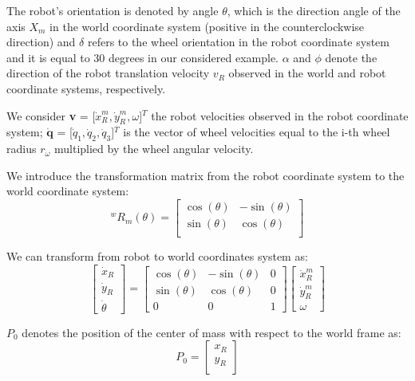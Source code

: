 The robot's orientation is denoted by angle $\theta$, which is the direction angle of the axis $X_m$ in the world coordinate system (positive in the counterclockwise direction) and $\delta$ refers to the wheel orientation in the robot coordinate system and it is equal to 30 degrees in our considered example. $\alpha$ and $\phi$ denote the direction of the robot translation velocity $v_R$ observed in the world and robot coordinate systems, respectively.

We consider \textbf{v} = [$\dot{x}^m_R,\dot{y}^m_R,\omega$]$^T$ the robot velocities observed in the robot coordinate system; $\mathbf{\dot{q}}$ = [$\dot{q}_1,\dot{q}_2,\dot{q}_3$]$^T$ is the vector of wheel velocities equal to the i-th wheel radius $r_\omega$ multiplied by the wheel angular velocity.

We introduce the transformation matrix from the robot coordinate system to the world coordinate system:
\begin{equation}
^wR_m(\theta)=\begin{bmatrix}
\cos(\theta) &-\sin(\theta)\\
\sin(\theta) & \cos(\theta)\\
\end{bmatrix}
\end{equation}

We can transform from robot to world coordinates system as:
\begin{equation}
\begin{bmatrix}
\dot{x}_R\\
\dot{y}_R\\
\dot{\theta}
\end{bmatrix} =
\begin{bmatrix}
\cos(\theta) &-\sin(\theta) & 0\\
\sin(\theta) & \cos(\theta) & 0\\
0 & 0 & 1
\end{bmatrix}
\begin{bmatrix}
\dot{x}^m_R\\
\dot{y}^m_R\\
\omega
\end{bmatrix}
\label{eq:rotation}
\end{equation}

$P_0$ denotes the position of the center of mass with respect to the world frame as:
\begin{equation}
P_0 = 	\begin{bmatrix}
x_R\\
y_R\\
\end{bmatrix}
\end{equation}

